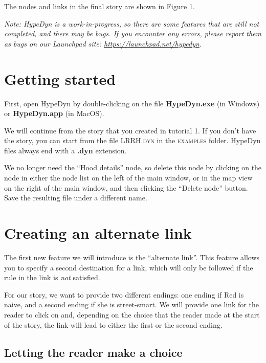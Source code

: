 \documentclass{article}
\begin{document}
The nodes and links in the final story are shown in Figure 1.

\textit{Note:  HypeDyn is a work-in-progress, so there are some features that are still
not completed, and there may be bugs. If you encounter any errors, please
report them as bugs on our Launchpad site: \url{https://launchpad.net/hypedyn}.}

\section{Getting started}

First, open HypeDyn by double-clicking on the file \textbf{HypeDyn.exe} (in
Windows) or \textbf{HypeDyn.app} (in MacOS).

We will continue from the story that you created in tutorial 1. If you don't
have the story, you can start from the file \textsc{LRRH.dyn} in the
\textsc{examples} folder. HypeDyn files always end with a \textbf{.dyn} extension.


We no longer need the ``Hood details'' node, so delete this node by clicking on
the node in either the node list on the left of the main window, or in the
map view on the right of the main window, and then clicking the ``Delete node''
button. Save the resulting file under a different name.

\section{Creating an alternate link}

The first new feature we will introduce is the ``alternate link''. This feature
allows you to specify a second destination for a link, which will only be
followed if the rule in the link is \textit{not} satisfied.

For our story, we want to provide two different endings: one ending if Red is
naive, and a second ending if she is street-smart. We will provide one link for
the reader to click on and, depending on the choice that the reader made at the
start of the story, the link will lead to either the first or the second ending.

\subsection{Letting the reader make a choice}
\end{document}
